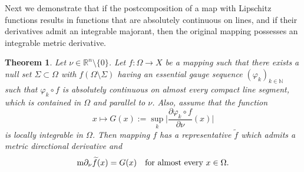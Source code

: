 \documentclass[reqno]{amsart}
\newtheorem{thm}{Theorem}[section]
\begin{document}
Next we demonstrate that if the postcomposition of a map with Lipschitz functions results in functions that are absolutely continuous on lines, and if their derivatives admit an integrable majorant, then the original mapping possesses an integrable metric derivative.
\begin{thm}\label{theorem:lip-derivative}
Let $\nu\in \mathbb R^n\setminus\{0\}$.
Let $f:\Omega\to X$ be a mapping such that there exists a null set $\Sigma\subset \Omega$ with
$f(\Omega\setminus\Sigma)$ having an essential gauge sequence $(\varphi_k)_{k\in\mathbb N}$
such that $\varphi_k\circ f$ is absolutely continuous on almost every compact line segment, which is contained in $\Omega$
and parallel to $\nu$. 
Also, assume that the function
\[
x\mapsto G(x) := \sup_{k} \bigg| \frac{\partial \varphi_{k}\circ f}{\partial\nu}(x)\bigg|
\]
is locally integrable in $\Omega$.
Then mapping $f$ has a representative $\widetilde f$ which admits a metric directional derivative and
\begin{equation}\label{eq:md=G}
\textnormal{m}\partial_\nu \widetilde f(x) = G(x) \quad \text{for almost every } x\in\Omega.
\end{equation}
\end{thm}
\end{document}
